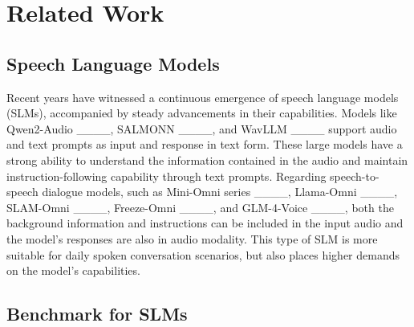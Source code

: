 \section{Related Work}
\subsection{Speech Language Models}
Recent years have witnessed a continuous emergence of speech language models (SLMs), accompanied by steady advancements in their capabilities. Models like Qwen2-Audio ____, SALMONN ____, and WavLLM ____ support audio and text prompts as input and response in text form. These large models have a strong ability to understand the information contained in the audio and maintain instruction-following capability through text prompts. Regarding speech-to-speech dialogue models, such as Mini-Omni series ____, Llama-Omni ____, SLAM-Omni ____, Freeze-Omni ____, and GLM-4-Voice ____, both the background information and instructions can be included in the input audio and the model's responses are also in audio modality. This type of SLM is more suitable for daily spoken conversation scenarios, but also places higher demands on the model's capabilities.

\subsection{Benchmark for SLMs}

